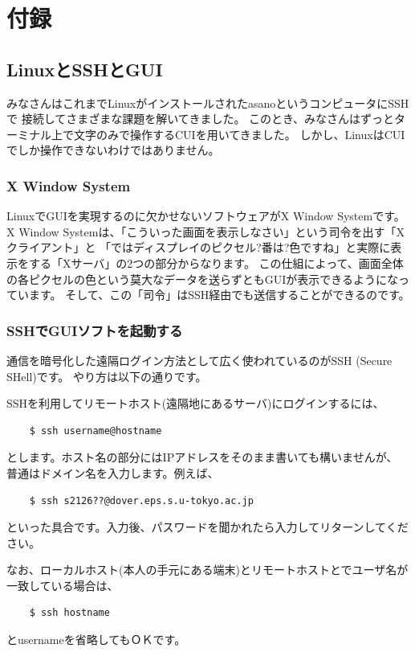 \documentclass[a4j]{ltjreport}
\begin{document}
    



    \chapter{付録}
    \section{LinuxとSSHとGUI}
    みなさんはこれまでLinuxがインストールされたasanoというコンピュータにSSHで
    接続してさまざまな課題を解いてきました。
    このとき、みなさんはずっとターミナル上で文字のみで操作するCUIを用いてきました。
    しかし、LinuxはCUIでしか操作できないわけではありません。

    \subsection{X Window System}
    LinuxでGUIを実現するのに欠かせないソフトウェアがX Window Systemです。
    X Window Systemは、「こういった画面を表示しなさい」という司令を出す「Xクライアント」と
    「ではディスプレイのピクセル?番は?色ですね」と実際に表示をする「Xサーバ」の2つの部分からなります。
    この仕組によって、画面全体の各ピクセルの色という莫大なデータを送らずともGUIが表示できるようになっています。
    そして、この「司令」はSSH経由でも送信することができるのです。
 
    \subsection{SSHでGUIソフトを起動する}
    通信を暗号化した遠隔ログイン方法として広く使われているのがSSH (Secure SHell)です。
    やり方は以下の通りです。

    SSHを利用してリモートホスト(遠隔地にあるサーバ)にログインするには、
    \begin{verbatim}
    $ ssh username@hostname
    \end{verbatim}
    とします。ホスト名の部分にはIPアドレスをそのまま書いても構いませんが、
    普通はドメイン名を入力します。例えば、
    \begin{verbatim}
    $ ssh s2126??@dover.eps.s.u-tokyo.ac.jp
    \end{verbatim}
    といった具合です。入力後、パスワードを聞かれたら入力してリターンしてください。

    なお、ローカルホスト(本人の手元にある端末)とリモートホストとでユーザ名が一致している場合は、
    \begin{verbatim}
    $ ssh hostname
    \end{verbatim}
    とusernameを省略してもＯＫです。
\end{document}
